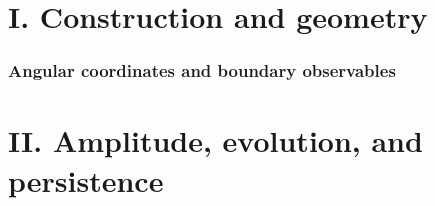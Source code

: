 
\clearpage
{\setlength{\parskip}{0pt}\fontsize{10}{12}\selectfont\tableofcontents}
\clearpage
\part*{I. Construction and geometry}

\clearpage
\clearpage

\clearpage


\clearpage

\clearpage
\clearpage


\clearpage


\clearpage

\clearpage

\clearpage

\clearpage

\clearpage
\section{Angular coordinates and boundary observables}

\clearpage

\clearpage

\clearpage

\clearpage

\clearpage

\clearpage

\clearpage

\clearpage

\clearpage
\part*{II. Amplitude, evolution, and persistence}

\clearpage

\clearpage

\clearpage

\clearpage

\clearpage

\clearpage

\clearpage

\clearpage

\clearpage
